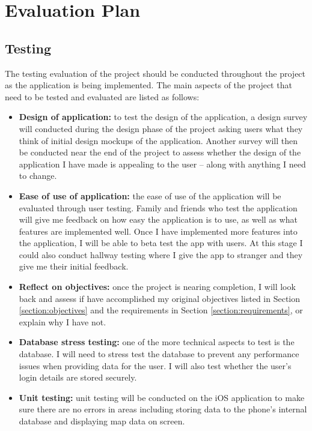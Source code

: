 \chapter{Evaluation Plan} \label{chapter:evaluation-plan}

\section{Testing}

The testing evaluation of the project should be conducted throughout the project as the application is being implemented. The main aspects of the project that need to be tested and evaluated are listed as follows:

\begin{itemize}
  \item \textbf{Design of application:} to test the design of the application, a design survey will conducted during the design phase of the project asking users what they think of initial design mockups of the application. Another survey will then be conducted near the end of the project to assess whether the design of the application I have made is appealing to the user -- along with anything I need to change.
  \item \textbf{Ease of use of application:} the ease of use of the application will be evaluated through user testing. Family and friends who test the application will give me feedback on how easy the application is to use, as well as what features are implemented well. Once I have implemented more features into the application, I will be able to beta test the app with users. At this stage I could also conduct hallway testing where I give the app to stranger and they give me their initial feedback.
  \item \textbf{Reflect on objectives:} once the project is nearing completion, I will look back and assess if have accomplished my original objectives listed in Section \ref{section:objectives} and the requirements in Section \ref{section:requirements}, or explain why I have not.
  \item \textbf{Database stress testing:} one of the more technical aspects to test is the database. I will need to stress test the database to prevent any performance issues when providing data for the user. I will also test whether the user's login details are stored securely.
  \item \textbf{Unit testing:} unit testing will be conducted on the iOS application to make sure there are no errors in areas including storing data to the phone's internal database and displaying map data on screen.
\end{itemize}

